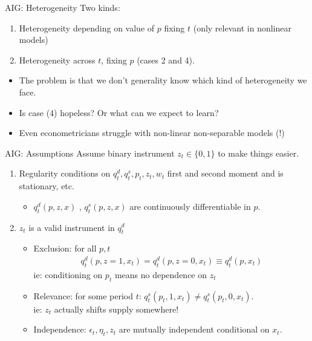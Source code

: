 \begin{frame}{AIG: Heterogeneity}
Two kinds:
\begin{enumerate}
\item Heterogeneity depending on value of $p$ fixing $t$ (only relevant in nonlinear models)
\item Heterogeneity across $t$, fixing $p$ (cases 2 and 4).
\end{enumerate}
\begin{itemize}
\item The problem is that we don't generality know which kind of heterogeneity we face.
\item Is case (4) hopeless? Or what can we expect to learn?
\item Even econometricians struggle with non-linear non-separable models (!)
\end{itemize}
\end{frame}

\begin{frame}{AIG: Assumptions}
Assume binary instrument $z_{t} \in \{0,1\}$ to make things easier.
\begin{enumerate}
\item Regularity conditions on $q_t^d, q_t^s,p_t,z_t,w_t$ first and second moment and is stationary, etc.
\begin{itemize}
\item  $q_t^d(p,z,x)$ ,  $q_t^s(p,z,x)$ are continuously differentiable in $p$.
\end{itemize}
\item $z_t$ is a valid instrument in $q_t^d$
\begin{itemize}
\item Exclusion: for all $p,t$ 
\begin{eqnarray*}
q_t^d(p,z=1,x_t) = q_t^d(p,z=0,x_t) \equiv q_t^d(p,x_t)
\end{eqnarray*}
ie: conditioning on $p_t$ means no dependence on $z_t$
\item Relevance: for some period $t$: $q_t^s(p_t,1,x_t) \neq q_t^s(p_t,0,x_t)$.\\
ie: $z_t$ actually shifts supply somewhere!
\item Independence: $\epsilon_t, \eta_t, z_t$ are mutually independent conditional on $x_t$.
\end{itemize}
\end{enumerate}
\end{frame}

